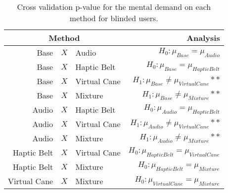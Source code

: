 
\begin{table}[!htb]
\centering
\caption{Cross validation p-value for the mental demand on each method for blinded users.}
\label{tab:lsd_mental_demand}
\begin{tabular}{rclr}
\toprule
      \multicolumn{3}{c}{Method} &                                       Analysis \\
\midrule
              Base & $X$ & Audio &               $H_0 : \mu_{Base} = \mu_{Audio}$ \\
        Base & $X$ & Haptic Belt &         $H_0 : \mu_{Base} = \mu_{Haptic Belt}$ \\
       Base & $X$ & Virtual Cane &    $H_1 : \mu_{Base} \ne \mu_{Virtual Cane}**$ \\
            Base & $X$ & Mixture &         $H_1 : \mu_{Base} \ne \mu_{Mixture}**$ \\
       Audio & $X$ & Haptic Belt &        $H_0 : \mu_{Audio} = \mu_{Haptic Belt}$ \\
      Audio & $X$ & Virtual Cane &   $H_1 : \mu_{Audio} \ne \mu_{Virtual Cane}**$ \\
           Audio & $X$ & Mixture &        $H_1 : \mu_{Audio} \ne \mu_{Mixture}**$ \\
Haptic Belt & $X$ & Virtual Cane & $H_0 : \mu_{Haptic Belt} = \mu_{Virtual Cane}$ \\
     Haptic Belt & $X$ & Mixture &      $H_0 : \mu_{Haptic Belt} = \mu_{Mixture}$ \\
    Virtual Cane & $X$ & Mixture &     $H_0 : \mu_{Virtual Cane} = \mu_{Mixture}$ \\
\bottomrule
\end{tabular}
\end{table}

